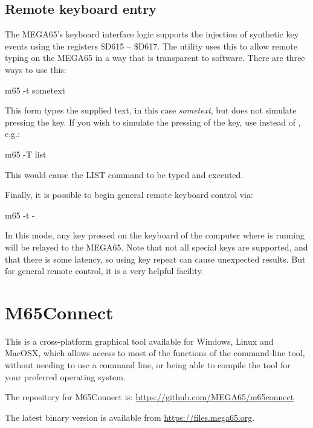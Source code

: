 \subsection{Remote keyboard entry}

The MEGA65's keyboard interface logic supports the injection of
synthetic key events using the registers \$D615 -- \$D617.
The  utility uses this to allow remote typing on the MEGA65
in a way that is transparent to software.  There are three ways to use
this:

\begin{screenoutput}
m65 -t sometext
\end{screenoutput}

This form types the supplied text, in this case {\em sometext}, but
does not simulate pressing the  key.  If you wish
to simulate the pressing of the  key, use 
instead of , e.g.:

\begin{screenoutput}
m65 -T list
\end{screenoutput}

This would cause the LIST command to be typed and executed.

Finally, it is possible to begin general remote keyboard control via:

\begin{screenoutput}
m65 -t -
\end{screenoutput}

In this mode, any key pressed on the keyboard of the computer
where  is running will be relayed to the MEGA65.  Note that
not all special keys are supported, and that there is some latency, so
using key repeat can cause unexpected results.  But for general remote
control, it is a very helpful facility.


\section{M65Connect}

This is a cross-platform graphical tool available for Windows, Linux
and MacOSX, which allows access to most of the functions of
the  command-line tool, without needing to use a
command line, or being able to compile the tool for your preferred
operating system.

The repository for M65Connect is: \url{https://github.com/MEGA65/m65connect}

The latest binary version is available from \url{https://files.mega65.org}.

